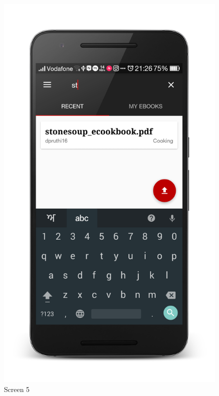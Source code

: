 \begin{figure}[ht]
\centering
\includegraphics[scale=0.13]{images/d10.png}
\caption{Screen 5}
\end{figure}

\newpage

